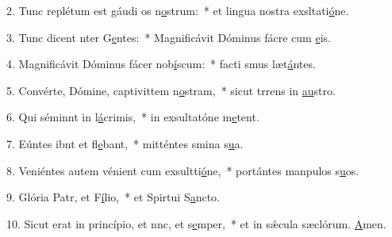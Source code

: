 2. Tunc replétum est gáudi os n\uline{o}strum:~* et lingua nostra exsltati\uline{ó}ne.\par 
3. Tunc dicent nter G\uline{e}ntes:~* Magnificávit Dóminus fácre cum \uline{e}is.\par 
4. Magnificávit Dóminus fácer nob\uline{í}scum:~* facti smus læt\uline{á}ntes.\par 
5. Convérte, Dómine, captivittem n\uline{o}stram,~* sicut trrens in \uline{au}stro.\par 
6. Qui séminnt in l\uline{á}crimis,~* in exsultatóne m\uline{e}tent.\par 
7. Eúntes ibnt et fl\uline{e}bant,~* mitténtes smina s\uline{u}a.\par 
8. Veniéntes autem vénient cum exsultti\uline{ó}ne,~* portántes manpulos s\uline{u}os.\par 
9. Glória Patr, et F\uline{í}lio,~* et Spirtui S\uline{a}ncto.\par 
10. Sicut erat in princípio, et nnc, et s\uline{e}mper,~* et in sǽcula sæclórum. \uline{A}men.\par 

